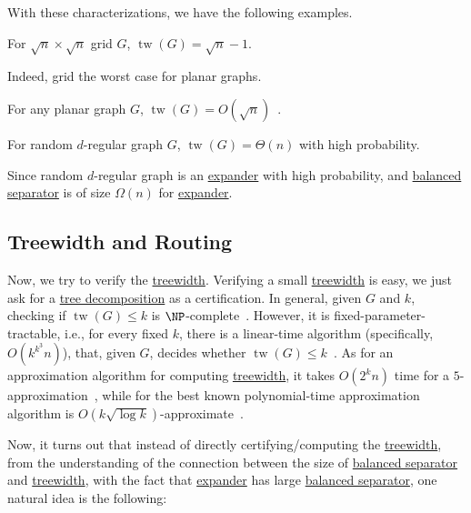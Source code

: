 With these characterizations, we have the following examples.

\begin{eg}[Grid]
	For \(\sqrt{n} \times \sqrt{n} \) grid \(G\), \(\operatorname{tw}(G) = \sqrt{n} - 1 \).
\end{eg}

Indeed, grid the worst case for planar graphs.

\begin{eg}\label{eg:planar-separator-theorem}
	For any planar graph \(G\), \(\operatorname{tw}(G) = O(\sqrt{n} )\)~\cite{lipton1979separator}.
\end{eg}

\begin{eg}
	For random \(d\)-regular graph \(G\), \(\operatorname{tw}(G) = \Theta (n)\) with high probability.
\end{eg}
\begin{explanation}
	Since random \(d\)-regular graph is an \hyperref[def:expander]{expander} with high probability, and \hyperref[def:balanced-separator]{balanced separator} is of size \(\Omega (n)\) for \hyperref[def:expander]{expander}.
\end{explanation}

\subsection{Treewidth and Routing}
Now, we try to verify the \hyperref[def:treewidth]{treewidth}. Verifying a small \hyperref[def:treewidth]{treewidth} is easy, we just ask for a \hyperref[def:tree-decomposition]{tree decomposition} as a certification. In general, given \(G\) and \(k\), checking if \(\operatorname{tw}(G) \leq k\) is \(\NP\)-complete~\cite{arnborg1987complexity}. However, it is fixed-parameter-tractable, i.e., for every fixed \(k\), there is a linear-time algorithm (specifically, \(O(k^{k^3} n)\)), that, given \(G\), decides whether \(\operatorname{tw}(G) \leq k\)~\cite{bodlaender1993linear}. As for an approximation algorithm for computing \hyperref[def:treewidth]{treewidth}, it takes \(O(2^k n)\) time for a \(5\)-approximation~\cite{bodlaender2016c}, while for the best known polynomial-time approximation algorithm is \(O(k \sqrt{\log k} )\)-approximate~\cite{feige2005improved}.

Now, it turns out that instead of directly certifying/computing the \hyperref[def:treewidth]{treewidth}, from the understanding of the connection between the size of \hyperref[def:balanced-separator]{balanced separator} and \hyperref[def:treewidth]{treewidth}, with the fact that \hyperref[def:expander]{expander} has large \hyperref[def:balanced-separator]{balanced separator}, one natural idea is the following:

